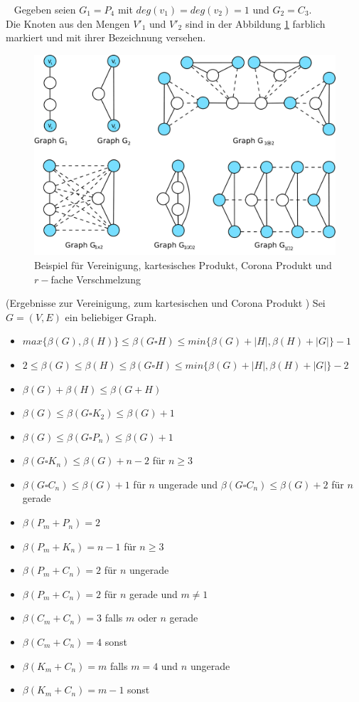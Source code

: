 \begin{bsp} ~ \newline
Gegeben seien $G_1=P_4$ mit $deg(v_1)=deg(v_2)=1$ und $G_2=C_3$.\\Die Knoten aus den Mengen $V'_1$ und $V'_2$ sind in der Abbildung \ref{bild:vereinigung} farblich markiert und mit ihrer Bezeichnung versehen.
\begin{figure}[h!]
		\centering 		 
   \includegraphics[width=350pt]{bilder/struktur2.pdf}
	\caption{Beispiel für Vereinigung, kartesisches Produkt, Corona Produkt und $r-$fache Verschmelzung}
  	 \label{bild:vereinigung}
  	 \end{figure}
\end{bsp}
\begin{lem}(Ergebnisse zur Vereinigung, zum kartesischen und Corona Produkt \cite{somefamiliesofgraphs})\newline
Sei $G=(V,E)$ ein beliebiger Graph.
\begin{itemize}
\item $max\{\beta(G),\beta(H)\}\leq \beta(G\square H) \leq min\{\beta(G)+|H|,\beta(H)+|G|\}-1$
\item $2 \leq \beta(G) \leq \beta(H) \leq \beta(G\square H) \leq min\{\beta(G)+|H|,\beta(H)+|G|\}-2$
\item $\beta(G)+\beta(H) \leq \beta(G+H)$
\item $\beta(G)\leq \beta(G\square K_2) \leq \beta(G)+1$
\item $\beta(G)\leq \beta(G\square P_n) \leq \beta(G)+1$
\item $\beta(G\square K_n) \leq \beta(G)+n-2$ für $n \geq 3$
\item $\beta(G\square C_n) \leq \beta(G)+1$ für $n$ ungerade und $\beta(G\square C_n) \leq \beta(G)+2$ für $n$ gerade
\item $\beta(P_m+P_n)=2$
\item $\beta(P_m+K_n)=n-1$ für $n\geq 3$
\item $\beta(P_m+C_n)=2$ für $n$ ungerade
\item $\beta(P_m+C_n)=2$ für $n$ gerade und $m \neq 1$
\item $\beta(C_m+C_n)=3$ falls $m$ oder $n$ gerade
\item $\beta(C_m+C_n)=4$ sonst
\item $\beta(K_m+C_n)=m$ falls $m=4$ und $n$ ungerade
\item $\beta(K_m+C_n)=m-1$ sonst
\end{itemize}
\end{lem}
